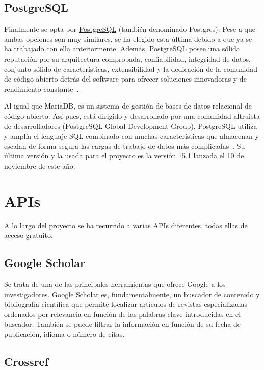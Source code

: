 \subsection{PostgreSQL}
Finalmente se opta por \href{https://www.postgresql.org/}{PostgreSQL} (también denominado Postgres). Pese a que ambas opciones son muy similares, se ha elegido esta última debido a que ya se ha trabajado con ella anteriormente. Además, PostgreSQL posee una sólida reputación por su arquitectura comprobada, confiabilidad, integridad de datos, conjunto sólido de características, extensibilidad y la dedicación de la comunidad de código abierto detrás del software para ofrecer soluciones innovadoras y de rendimiento constante~\cite{Postgresql.org}.


Al igual que MariaDB, es un sistema de gestión de bases de datos relacional de código abierto. Así pues, está dirigido y desarrollado por una comunidad altruista de desarrolladores (PostgreSQL Global Development Group).
PostgreSQL utiliza y amplía el lenguaje SQL combinado con muchas características que almacenan y escalan de forma segura las cargas de trabajo de datos más complicadas~\cite{Postgresql.org}. 
Su última versión y la usada para el proyecto es la versión 15.1 lanzada el 10 de noviembre de este año.



\section{APIs}
A lo largo del proyecto se ha recurrido a varias APIs diferentes, todas ellas de acceso gratuito.

\subsection{Google Scholar}
Se trata de una de las principales herramientas que ofrece Google a los investigadores. \href{https://scholar.google.com/}{Google Scholar} es, fundamentalmente, un buscador de contenido y bibliografía científica que permite localizar artículos de revistas especializadas ordenados por relevancia en función de las palabras clave introducidas en el buscador. También se puede  filtrar la información en función de su fecha de publicación, idioma o número de citas.


\subsection{Crossref}

